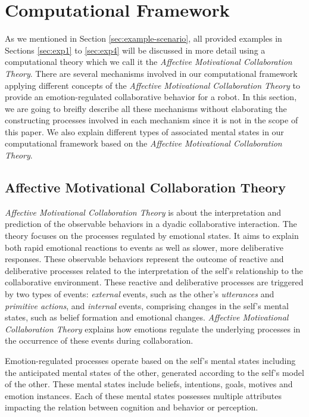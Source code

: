 \section{Computational Framework}
\label{sec:computational-framework}

As we mentioned in Section \ref{sec:example-scenario}, all provided examples in
Sections \ref{sec:exp1} to \ref{sec:exp4} will be discussed in more detail using
a computational theory which we call it the \textit{Affective Motivational
Collaboration Theory}. There are several mechanisms involved in our
computational framework applying different concepts of the \textit{Affective
Motivational Collaboration Theory} to provide an emotion-regulated collaborative
behavior for a robot. In this section, we are going to breifly describe all
these mechanisms without elaborating the constructing processes involved in
each mechanism since it is not in the scope of this paper. We also explain
different types of associated mental states in our computational framework based
on the \textit{Affective Motivational Collaboration Theory}.

\subsection{Affective Motivational Collaboration Theory}
\label{sec:AMCT}

\textit{Affective Motivational Collaboration Theory} is about the interpretation
and prediction of the observable behaviors in a dyadic collaborative
interaction. The theory focuses on the processes regulated by emotional states.
It aims to explain both rapid emotional reactions to events as well as
slower, more deliberative responses. These observable behaviors represent the
outcome of reactive and deliberative processes related to the interpretation of
the self's relationship to the collaborative environment. These reactive and
deliberative processes are triggered by two types of events: \textit{external}
events, such as the other's \textit{utterances} and \textit{primitive actions},
and \textit{internal} events, comprising changes in the self's mental states,
such as belief formation and emotional changes. \textit{Affective Motivational
Collaboration Theory} explains how emotions regulate the underlying processes in
the occurrence of these events during collaboration.

Emotion-regulated processes operate based on the self's mental states including
the anticipated mental states of the other, generated according to the self's
model of the other. These mental states include beliefs, intentions, goals,
motives and emotion instances. Each of these mental states possesses multiple
attributes impacting the relation between cognition and behavior or perception.


